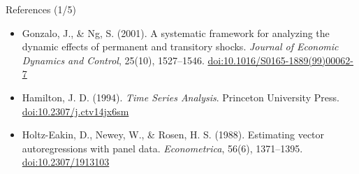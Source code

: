 \begin{frame}{References (1/5)}
\begin{itemize}
    \item Gonzalo, J., \& Ng, S. (2001). A systematic framework for analyzing the dynamic effects of permanent and transitory shocks. \textit{Journal of Economic Dynamics and Control}, 25(10), 1527--1546. \href{https://doi.org/10.1016/S0165-1889(99)00062-7}{doi:10.1016/S0165-1889(99)00062-7}
    \item Hamilton, J. D. (1994). \textit{Time Series Analysis}. Princeton University Press. \href{https://doi.org/10.2307/j.ctv14jx6sm}{doi:10.2307/j.ctv14jx6sm}
    \item Holtz-Eakin, D., Newey, W., \& Rosen, H. S. (1988). Estimating vector autoregressions with panel data. \textit{Econometrica}, 56(6), 1371--1395. \href{https://doi.org/10.2307/1913103}{doi:10.2307/1913103}
\end{itemize}
\end{frame}

